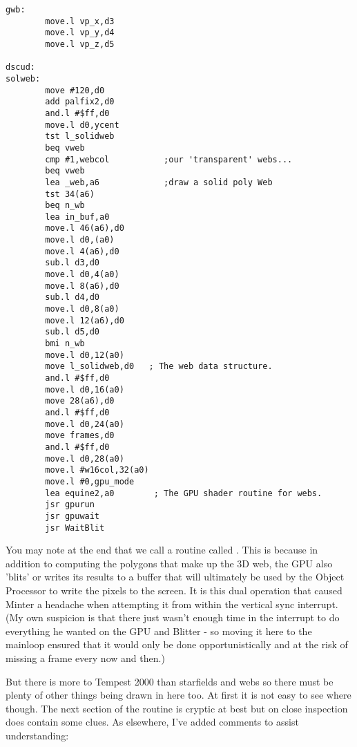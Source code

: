 \begin{lstlisting}[escapechar=\%]
gwb:
        move.l vp_x,d3
        move.l vp_y,d4
        move.l vp_z,d5

dscud:
solweb:
        move #120,d0
        add palfix2,d0
        and.l #$ff,d0
        move.l d0,ycent
        tst l_solidweb
        beq vweb
        cmp #1,webcol           ;our 'transparent' webs...
        beq vweb
        lea _web,a6             ;draw a solid poly Web
        tst 34(a6)
        beq n_wb
        lea in_buf,a0
        move.l 46(a6),d0
        move.l d0,(a0)
        move.l 4(a6),d0
        sub.l d3,d0
        move.l d0,4(a0)
        move.l 8(a6),d0
        sub.l d4,d0
        move.l d0,8(a0)
        move.l 12(a6),d0
        sub.l d5,d0
        bmi n_wb
        move.l d0,12(a0)
        move l_solidweb,d0   ; The web data structure.
        and.l #$ff,d0
        move.l d0,16(a0)
        move 28(a6),d0
        and.l #$ff,d0
        move.l d0,24(a0)
        move frames,d0
        and.l #$ff,d0
        move.l d0,28(a0)
        move.l #w16col,32(a0)
        move.l #0,gpu_mode
        lea equine2,a0        ; The GPU shader routine for webs.
        jsr gpurun
        jsr gpuwait
        jsr WaitBlit
\end{lstlisting}
You may note at the end that we call a routine called . This is because in addition to computing the
polygons that make up the 3D web, the GPU also 'blits' or writes its results to a buffer that will ultimately be used
by the Object Processor to write the pixels to the screen. It is this dual operation that caused Minter a headache
when attempting it from within the vertical sync interrupt. (My own suspicion is that there just wasn't enough time in the
interrupt to do everything he wanted on the GPU and Blitter - so moving it here to the mainloop ensured that it would only
be done opportunistically and at the risk of missing a frame every now and then.)

But there is more to Tempest 2000 than starfields and webs so there must be plenty of other things being drawn in here too.
At first it is not easy to see where though. The next section of the  routine is cryptic at best 
but on close inspection does contain some clues. As elsewhere, I've added comments to assist understanding:

